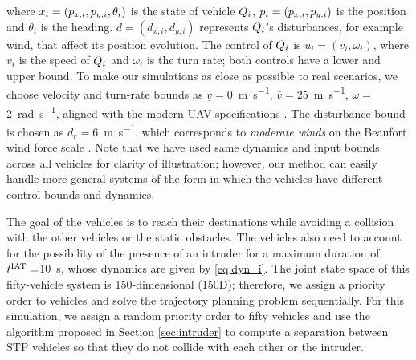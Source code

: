 \noindent where $x_i = (p_{x,i}, p_{y,i}, \theta_i)$ is the state of vehicle $Q_i$, $p_i = (p_{x,i}, p_{y,i})$ is the position and $\theta_i$ is the heading. $d = (d_{x,i}, d_{y,i})$ represents $Q_i$'s disturbances, for example wind, that affect its position evolution. The control of $Q_i$ is $u_i = (v_i, \omega_i)$, where $v_i$ is the speed of $Q_i$ and $\omega_i$ is the turn rate; both controls have a lower and upper bound. To make our simulations as close as possible to real scenarios, we choose velocity and turn-rate bounds as $\underline{v} = $\SI{0}{\m\per\s}, $\bar{v} = $\SI{25}{\m\per\s}, $\bar\omega = $\SI{2}{\radian\per\s}, aligned with the modern UAV specifications \cite{UAVspecs1, UAVspecs2}. The disturbance bound is chosen as $d_{r} = $\SI{6}{\m\per\s}, which corresponds to \textit{moderate winds} on the Beaufort wind force scale \cite{Windscale}. Note that we have used same dynamics and input bounds across all vehicles for clarity of illustration; however, our method can easily handle more general systems of the form in which the vehicles have different control bounds and dynamics.

The goal of the vehicles is to reach their destinations while avoiding a collision with the other vehicles or the static obstacles. The vehicles also need to account for the possibility of the presence of an intruder for a maximum duration of $t^\text{IAT} = $\SI{10}{\s}, whose dynamics are given by \eqref{eq:dyn_i}. The joint state space of this fifty-vehicle system is 150-dimensional (150D); therefore, we assign a priority order to vehicles and solve the trajectory planning problem sequentially. For this simulation, we assign a random priority order to fifty vehicles and use the algorithm proposed in Section \ref{sec:intruder} to compute a separation between STP vehicles so that they do not collide with each other or the intruder. 

